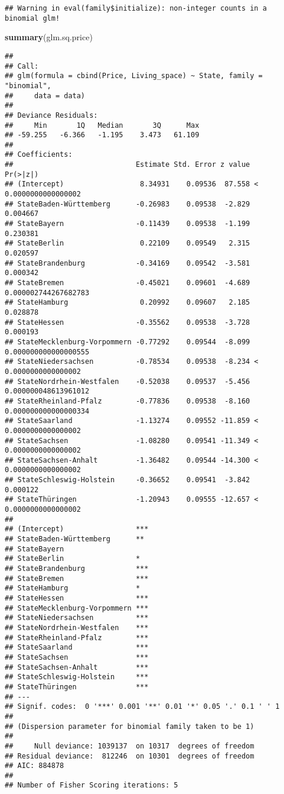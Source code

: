 \documentclass[
]{article}
\newenvironment{Shaded}{\begin{snugshade}}{\end{snugshade}}
\newcommand{\KeywordTok}[1]{\textcolor[rgb]{0.13,0.29,0.53}{\textbf{#1}}}
\newcommand{\NormalTok}[1]{#1}
\begin{document}
\begin{verbatim}
## Warning in eval(family$initialize): non-integer counts in a binomial glm!
\end{verbatim}

\begin{Shaded}
\begin{Highlighting}[]
\KeywordTok{summary}\NormalTok{(glm.sq.price)}
\end{Highlighting}
\end{Shaded}

\begin{verbatim}
## 
## Call:
## glm(formula = cbind(Price, Living_space) ~ State, family = "binomial", 
##     data = data)
## 
## Deviance Residuals: 
##     Min       1Q   Median       3Q      Max  
## -59.255   -6.366   -1.195    3.473   61.109  
## 
## Coefficients:
##                             Estimate Std. Error z value             Pr(>|z|)
## (Intercept)                  8.34931    0.09536  87.558 < 0.0000000000000002
## StateBaden-Württemberg      -0.26983    0.09538  -2.829             0.004667
## StateBayern                 -0.11439    0.09538  -1.199             0.230381
## StateBerlin                  0.22109    0.09549   2.315             0.020597
## StateBrandenburg            -0.34169    0.09542  -3.581             0.000342
## StateBremen                 -0.45021    0.09601  -4.689 0.000002744267682783
## StateHamburg                 0.20992    0.09607   2.185             0.028878
## StateHessen                 -0.35562    0.09538  -3.728             0.000193
## StateMecklenburg-Vorpommern -0.77292    0.09544  -8.099 0.000000000000000555
## StateNiedersachsen          -0.78534    0.09538  -8.234 < 0.0000000000000002
## StateNordrhein-Westfalen    -0.52038    0.09537  -5.456 0.000000048613961012
## StateRheinland-Pfalz        -0.77836    0.09538  -8.160 0.000000000000000334
## StateSaarland               -1.13274    0.09552 -11.859 < 0.0000000000000002
## StateSachsen                -1.08280    0.09541 -11.349 < 0.0000000000000002
## StateSachsen-Anhalt         -1.36482    0.09544 -14.300 < 0.0000000000000002
## StateSchleswig-Holstein     -0.36652    0.09541  -3.842             0.000122
## StateThüringen              -1.20943    0.09555 -12.657 < 0.0000000000000002
##                                
## (Intercept)                 ***
## StateBaden-Württemberg      ** 
## StateBayern                    
## StateBerlin                 *  
## StateBrandenburg            ***
## StateBremen                 ***
## StateHamburg                *  
## StateHessen                 ***
## StateMecklenburg-Vorpommern ***
## StateNiedersachsen          ***
## StateNordrhein-Westfalen    ***
## StateRheinland-Pfalz        ***
## StateSaarland               ***
## StateSachsen                ***
## StateSachsen-Anhalt         ***
## StateSchleswig-Holstein     ***
## StateThüringen              ***
## ---
## Signif. codes:  0 '***' 0.001 '**' 0.01 '*' 0.05 '.' 0.1 ' ' 1
## 
## (Dispersion parameter for binomial family taken to be 1)
## 
##     Null deviance: 1039137  on 10317  degrees of freedom
## Residual deviance:  812246  on 10301  degrees of freedom
## AIC: 884878
## 
## Number of Fisher Scoring iterations: 5
\end{verbatim}
\end{document}
